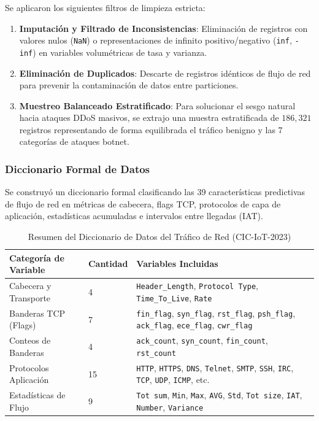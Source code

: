 Se aplicaron los siguientes filtros de limpieza estricta:
\begin{enumerate}
    \item \textbf{Imputación y Filtrado de Inconsistencias}: Eliminación de registros con valores nulos (\texttt{NaN}) o representaciones de infinito positivo/negativo (\texttt{inf}, \texttt{-inf}) en variables volumétricas de tasa y varianza.
    \item \textbf{Eliminación de Duplicados}: Descarte de registros idénticos de flujo de red para prevenir la contaminación de datos entre particiones.
    \item \textbf{Muestreo Balanceado Estratificado}: Para solucionar el sesgo natural hacia ataques DDoS masivos, se extrajo una muestra estratificada de $186,321$ registros representando de forma equilibrada el tráfico benigno y las 7 categorías de ataques botnet.
\end{enumerate}

\subsubsection{Diccionario Formal de Datos}
Se construyó un diccionario formal clasificando las 39 características predictivas de flujo de red en métricas de cabecera, flags TCP, protocolos de capa de aplicación, estadísticas acumuladas e intervalos entre llegadas (IAT).

\begin{table}[H]
\centering
\caption{Resumen del Diccionario de Datos del Tráfico de Red (CIC-IoT-2023)}
\label{tab:diccionario_resumen}
\small
\begin{tabular}{llp{7.5cm}}
\toprule
\textbf{Categoría de Variable} & \textbf{Cantidad} & \textbf{Variables Incluidas} \\
\midrule
Cabecera y Transporte & 4 & \texttt{Header\_Length}, \texttt{Protocol Type}, \texttt{Time\_To\_Live}, \texttt{Rate} \\
Banderas TCP (Flags) & 7 & \texttt{fin\_flag}, \texttt{syn\_flag}, \texttt{rst\_flag}, \texttt{psh\_flag}, \texttt{ack\_flag}, \texttt{ece\_flag}, \texttt{cwr\_flag} \\
Conteos de Banderas & 4 & \texttt{ack\_count}, \texttt{syn\_count}, \texttt{fin\_count}, \texttt{rst\_count} \\
Protocolos Aplicación & 15 & \texttt{HTTP}, \texttt{HTTPS}, \texttt{DNS}, \texttt{Telnet}, \texttt{SMTP}, \texttt{SSH}, \texttt{IRC}, \texttt{TCP}, \texttt{UDP}, \texttt{ICMP}, etc. \\
Estadísticas de Flujo & 9 & \texttt{Tot sum}, \texttt{Min}, \texttt{Max}, \texttt{AVG}, \texttt{Std}, \texttt{Tot size}, \texttt{IAT}, \texttt{Number}, \texttt{Variance} \\
\bottomrule
\end{tabular}
\end{table}

